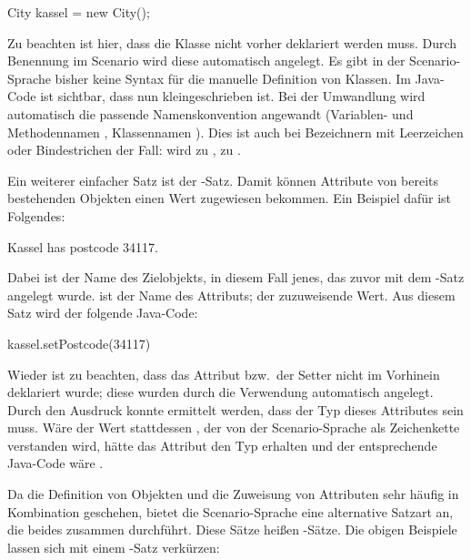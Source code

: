 \begin{jcodeblock}
    City kassel = new City();
\end{jcodeblock}

Zu beachten ist hier, dass die Klasse  nicht vorher deklariert werden muss.
Durch Benennung im Scenario wird diese automatisch angelegt.
Es gibt in der Scenario-Sprache bisher keine Syntax für die manuelle Definition von Klassen.
Im Java-Code ist sichtbar, dass  nun kleingeschrieben ist.
Bei der Umwandlung wird automatisch die passende Namenskonvention angewandt (Variablen- und Methodennamen , Klassennamen ).
Dies ist auch bei Bezeichnern mit Leerzeichen oder Bindestrichen der Fall:
 wird zu ,  zu .

Ein weiterer einfacher Satz ist der -Satz.
Damit können Attribute von bereits bestehenden Objekten einen Wert zugewiesen bekommen.
Ein Beispiel dafür ist Folgendes:

\begin{codeblock}
    Kassel has postcode 34117.
\end{codeblock}

Dabei ist  der Name des Zielobjekts, in diesem Fall jenes, das zuvor mit dem -Satz angelegt wurde.
 ist der Name des Attributs;  der zuzuweisende Wert.
Aus diesem Satz wird der folgende Java-Code:

\begin{jcodeblock}
    kassel.setPostcode(34117)
\end{jcodeblock}

Wieder ist zu beachten, dass das Attribut  bzw.\ der Setter  nicht im Vorhinein deklariert wurde;
diese wurden durch die Verwendung automatisch angelegt.
Durch den Ausdruck  konnte ermittelt werden, dass der Typ dieses Attributes  sein muss.
Wäre der Wert stattdessen , der von der Scenario-Sprache als Zeichenkette verstanden wird, hätte das Attribut den Typ  erhalten und der entsprechende Java-Code wäre .

Da die Definition von Objekten und die Zuweisung von Attributen sehr häufig in Kombination geschehen, bietet die Scenario-Sprache eine alternative Satzart an, die beides zusammen durchführt.
Diese Sätze heißen -Sätze.
Die obigen Beispiele lassen sich mit einem -Satz verkürzen:

